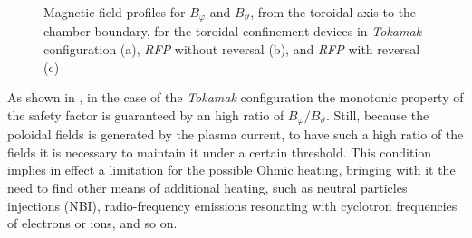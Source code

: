 \begin{figure}
    \centering
    \caption{Magnetic field profiles for $B_\varphi$ and $B_\vartheta$, from the toroidal axis to the chamber boundary, for the toroidal confinement devices in \textit{Tokamak} configuration (a), \textit{RFP} without reversal (b), and \textit{RFP} with reversal (c)    }
    \label{fig:intro_safety_factor_profiles}
\end{figure}
As shown in \Figure{\ref{fig:intro_safety_factor_profiles_a}}, in the case of the \textit{Tokamak} configuration the monotonic property of the safety factor is guaranteed by an high ratio of $B_\varphi/B_\vartheta$. Still, because the poloidal fields is generated by the plasma current, to have such a high ratio of the fields it is necessary to maintain it under a certain threshold. This condition implies in effect a limitation for the possible Ohmic heating, bringing with it the need to find other means of additional heating, such as neutral particles injections (NBI), radio-frequency emissions resonating with cyclotron frequencies of electrons or ions, and so on.

